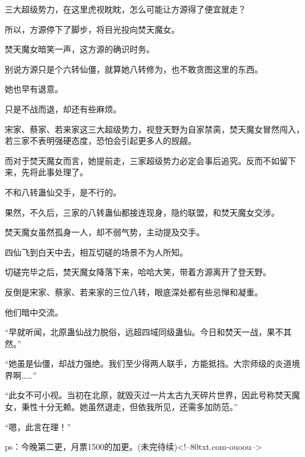 \begin{this_body}
三大超级势力，在这里虎视眈眈，怎么可能让方源得了便宜就走？

所以，方源停下了脚步，将目光投向焚天魔女。

焚天魔女暗笑一声，这方源的确识时务。

别说方源只是个六转仙僵，就算她八转修为，也不敢贪图这里的东西。

她也早有退意。

只是不战而退，却还有些麻烦。

宋家、蔡家、若来家这三大超级势力，视登天野为自家禁脔，焚天魔女冒然闯入，若三家不表明强硬态度，恐怕会引起更多人的觊觎。

而对于焚天魔女而言，她提前走，三家超级势力必定会事后追究。反而不如留下来，先将此事处理了。

不和八转蛊仙交手，是不行的。

果然，不久后，三家的八转蛊仙都接连现身，隐约联盟，和焚天魔女交涉。

焚天魔女虽然孤身一人，却不弱气势，主动提及交手。

四仙飞到白天中去，相互切磋的场景不为人所知。

切磋完毕之后，焚天魔女降落下来，哈哈大笑，带着方源离开了登天野。

反倒是宋家、蔡家、若来家的三位八转，眼底深处都有些忌惮和凝重。

他们暗中交流。

“早就听闻，北原蛊仙战力脱俗，远超四域同级蛊仙。今日和焚天一战，果不其然。”

“她虽是仙僵，却战力强绝。我们至少得两人联手，方能抵挡。大宗师级的炎道境界啊……”

“此女不可小视。当初在北原，就毁灭过一片太古九天碎片世界，因此号称焚天魔女，秉性十分无赖。她虽然退走，但依我所见，还需多加防范。”

“嗯，此言在理！”

ps：今晚第二更，月票1500的加更。(未完待续)<!--80txt.com-ouoou-->

\end{this_body}

